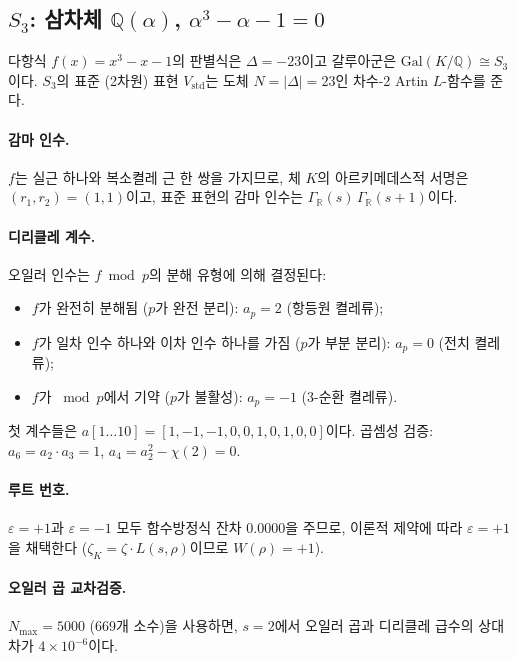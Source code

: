 \documentclass[11pt, a4paper]{article}
\theoremstyle{plain}
\theoremstyle{definition}
\newcommand{\abs}[1]{\left|#1\right|}
\newcommand{\Gal}{\mathrm{Gal}}       %
\begin{document}
\subsection{$S_{3}$: 삼차체 $\mathbb{Q}(\alpha)$, $\alpha^{3}-\alpha-1=0$}
\label{sec:s3-setup}

다항식 $f(x) = x^{3}-x-1$의 판별식은 $\Delta = -23$이고
갈루아군은 $\Gal(K/\mathbb{Q}) \cong S_{3}$이다. $S_{3}$의 표준
(2차원) 표현 $V_{\mathrm{std}}$는 도체 $N = \abs{\Delta} = 23$인
차수-2 Artin $L$-함수를 준다.

\paragraph{감마 인수.}
$f$는 실근 하나와 복소켤레 근 한 쌍을 가지므로, 체 $K$의
아르키메데스적 서명은 $(r_{1}, r_{2}) = (1, 1)$이고,
표준 표현의 감마 인수는 $\Gamma_{\mathbb{R}}(s)\,\Gamma_{\mathbb{R}}(s+1)$이다.

\paragraph{디리클레 계수.}
오일러 인수는 $f \bmod p$의 분해 유형에 의해 결정된다:
\begin{itemize}
  \item $f$가 완전히 분해됨 ($p$가 완전 분리): $a_{p} = 2$ (항등원 켤레류);
  \item $f$가 일차 인수 하나와 이차 인수 하나를 가짐 ($p$가 부분 분리):
    $a_{p} = 0$ (전치 켤레류);
  \item $f$가 $\bmod p$에서 기약 ($p$가 불활성): $a_{p} = -1$ (3-순환 켤레류).
\end{itemize}
첫 계수들은 $a[1\ldots10] = [1, -1, -1, 0, 0, 1, 0, 1, 0, 0]$이다.
곱셈성 검증: $a_{6} = a_{2}\cdot a_{3} = 1$, $a_{4} = a_{2}^{2} - \chi(2) = 0$.

\paragraph{루트 번호.}
$\varepsilon = +1$과 $\varepsilon = -1$ 모두 함수방정식 잔차 $0.0000$을 주므로,
이론적 제약에 따라 $\varepsilon = +1$을 채택한다
($\zeta_{K} = \zeta \cdot L(s,\rho)$이므로 $W(\rho)=+1$).

\paragraph{오일러 곱 교차검증.}
$N_{\max} = 5000$ (669개 소수)을 사용하면, $s=2$에서
오일러 곱과 디리클레 급수의 상대 차가 $4\times10^{-6}$이다.
\end{document}
